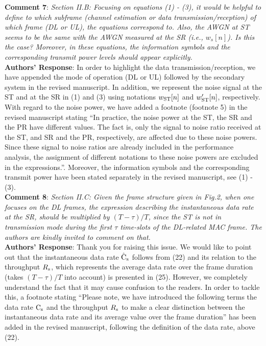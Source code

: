 \documentclass[12pt,a4wide,peerreview]{IEEEtran}
\newcommand{\tc}[1]{#1}
\begin{document}
\textbf{\tc{Comment 7}}: 
\textit{
Section II.B: Focusing on equations (1) - (3), it would be helpful to define to which subframe (channel estimation or data transmission/reception) of which frame (DL or UL), the equations correspond to. Also, the AWGN at ST seems to be the same with the AWGN measured at the SR (i.e., $w_s[n]$). Is this the case? Moreover, in these equations, the information symbols and the corresponding transmit power levels should appear explicitly.
}
\\
\textbf{Authors' Response}:
In order to highlight the data transmission/reception, we have appended the mode of operation (DL or UL) followed by the secondary system in the revised manuscript. In addition, we represent the noise signal at the ST and at the SR in (1) and (3) using notations $w_{\text{ST}}[n]$  and $w_{\text{ST}}'[n]$, respectively. With regard to the noise power, we have added a footnote (footnote 5) in the revised manuscript stating ``In practice, the noise power at the ST, the SR and the PR have different values. The fact is, only the signal to noise ratio received at the ST, and SR and the PR, respectively, are affected due to these noise powers. Since these signal to noise ratios are already included in the performance analysis, the assignment of different notations to these noise powers are excluded in the expressions.''. Moreover, the information symbols and the corresponding transmit power have been stated separately in the revised manuscript, see (1) - (3).
\\
\textbf{\tc{Comment 8}}: 
\textit{
Section II.C: Given the frame structure given in Fig.2, when one focuses on the DL frames, the expression describing the instantaneous data rate at the SR, should be multiplied by $(T - \tau)/T$, since the ST is not in transmission mode during the first $\tau$ time-slots of the DL-related MAC frame. The authors are kindly invited to comment on that.
}
\\
\textbf{Authors' Response}:
Thank you for raising this issue. We would like to point out that the instantaneous data rate $\hat{\text{{C}}}_{\text{s}}$ follows from (22) and its relation to the throughput $R_{\text{s}}$, which represents the average data rate over the frame duration (takes $(T - \tau)/T$ into account) is presented in (25). However, we completely understand the fact that it may cause confusion to the readers. In order to tackle this, a footnote stating ``Please note, we have introduced the following terms the data rate $\text{C}_{\text{s}}$ and the throughput $R_{\text{s}}$ to make a clear distinction between the instantaneous data rate and its average value over the frame duration'' has been added in the revised manuscript, following the definition of the data rate, above (22). 
\end{document}
